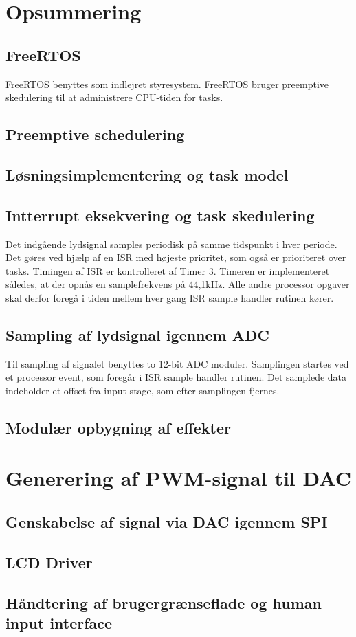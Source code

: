 \section{Opsummering}

\subsection{FreeRTOS}
FreeRTOS benyttes som indlejret styresystem. FreeRTOS bruger preemptive skedulering til at administrere CPU-tiden for tasks. 

\subsection{Preemptive schedulering}


\subsection{Løsningsimplementering og task model}


\subsection{Intterrupt eksekvering og task skedulering}
Det indgående lydsignal samples periodisk på samme tidspunkt i hver periode. 
Det gøres ved hjælp af en ISR med højeste prioritet, som også er prioriteret over tasks. 
Timingen af ISR er kontrolleret af Timer 3.
Timeren er implementeret således, at der opnås en samplefrekvens på 44,1kHz. 
Alle andre processor opgaver skal derfor foregå i tiden mellem hver gang ISR sample handler rutinen kører. 

\subsection{Sampling af lydsignal igennem ADC}
Til sampling af signalet benyttes to 12-bit ADC moduler. 
Samplingen startes ved et processor event, som foregår i ISR sample handler rutinen. 
Det samplede data indeholder et offset fra input stage, som efter samplingen fjernes. 

\subsection{Modulær opbygning af effekter}


\section{Generering af PWM-signal til DAC}


\subsection{Genskabelse af signal via DAC igennem SPI}


\subsection{LCD Driver}


\subsection{Håndtering af brugergrænseflade og human input interface}